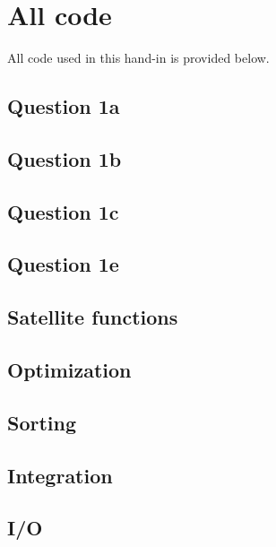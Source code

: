 \section{All code}
All code used in this hand-in is provided below.
\subsection{Question 1a}

\subsection{Question 1b}

\subsection{Question 1c}

\subsection{Question 1e}


\subsection{Satellite functions}


\subsection{Optimization}


\subsection{Sorting}


\subsection{Integration}


\subsection{I/O}


